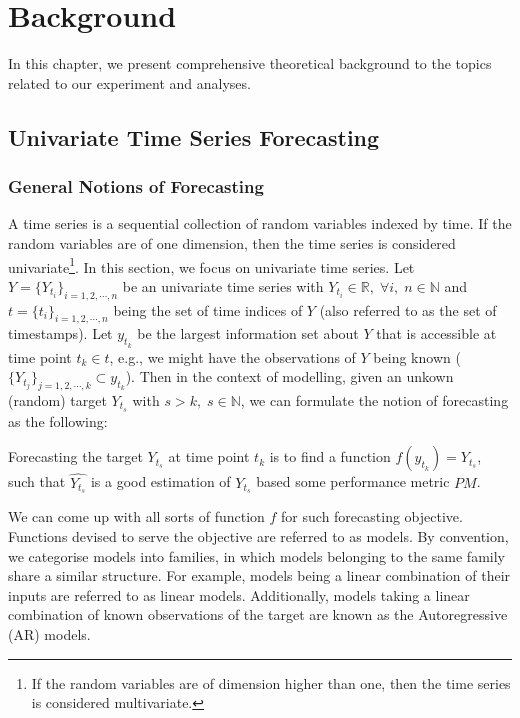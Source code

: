 \chapter{Background}\label{ch: background}

In this chapter, we present comprehensive theoretical background to the topics related to our experiment and analyses.

\section{Univariate Time Series Forecasting}

\subsection{General Notions of Forecasting}
A time series is a sequential collection of random variables indexed by time. If the random variables are of one dimension, then the time series is considered univariate\footnote{If the random variables are of dimension higher than one, then the time series is considered multivariate.}. In this section, we focus on univariate time series. Let $Y = \{Y_{t_i} \}_{i = 1, 2, \cdots, n}$ be an univariate time series with $ Y_{t_i} \in \mathbb{R}, \; \forall i, \; n \in \mathbb{N}$ and $t = \{t_i \}_{i = 1, 2, \cdots, n}$ being the set of time indices of $Y$ (also referred to as the set of timestamps). Let $y_{t_k}$ be the largest information set about $Y$ that is accessible at time point $t_k \in t$, e.g., we might have the observations of $Y$ being known ($\{Y_{t_j}\}_{j = 1, 2, \cdots, k } \subset y_{t_k}$). Then in the context of modelling, given an unkown (random) target $Y_{t_s}$ with $s > k, \; s \in \mathbb{N}$, we can formulate the notion of forecasting as the following:
\begin{displayquote}
    Forecasting the target $Y_{t_s}$ at time point $t_k$ is to find a function $f(y_{t_k}) = \widehat{Y_{t_s}}$, such that $\widehat{Y_{t_s}}$ is a good estimation of $Y_{t_s}$ based some performance metric $PM$.
\end{displayquote}

We can come up with all sorts of function $f$ for such forecasting objective. Functions devised to serve the objective are referred to as models. By convention, we categorise models into families, in which models belonging to the same family share a similar structure. For example, models being a linear combination of their inputs are referred to as linear models. Additionally, models taking a linear combination of known observations of the target are known as the Autoregressive (AR) models.

